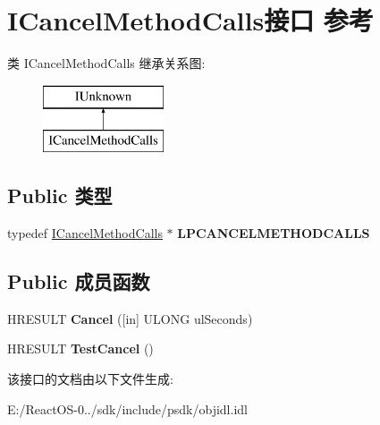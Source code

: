 \hypertarget{interface_i_cancel_method_calls}{}\section{I\+Cancel\+Method\+Calls接口 参考}
\label{interface_i_cancel_method_calls}
类 I\+Cancel\+Method\+Calls 继承关系图\+:\begin{figure}[H]
\begin{center}
\leavevmode
\includegraphics[height=2.000000cm]{interface_i_cancel_method_calls}
\end{center}
\end{figure}
\subsection*{Public 类型}
\begin{DoxyCompactItemize}
\item 
\mbox{\label{interface_i_cancel_method_calls_a931ddab7f59e6a86e57b96ee55425303}} 
typedef \hyperlink{interface_i_cancel_method_calls}{I\+Cancel\+Method\+Calls} $\ast$ {\bfseries L\+P\+C\+A\+N\+C\+E\+L\+M\+E\+T\+H\+O\+D\+C\+A\+L\+LS}
\end{DoxyCompactItemize}
\subsection*{Public 成员函数}
\begin{DoxyCompactItemize}
\item 
\mbox{\label{interface_i_cancel_method_calls_adb17d8eba4305e69436516f987698656}} 
H\+R\+E\+S\+U\+LT {\bfseries Cancel} (\mbox{[}in\mbox{]} U\+L\+O\+NG ul\+Seconds)
\item 
\mbox{\label{interface_i_cancel_method_calls_ab26443cb4135283378f0b9dbac2edfd2}} 
H\+R\+E\+S\+U\+LT {\bfseries Test\+Cancel} ()
\end{DoxyCompactItemize}


该接口的文档由以下文件生成\+:\begin{DoxyCompactItemize}
\item 
E\+:/\+React\+O\+S-\/0../sdk/include/psdk/objidl.\+idl\end{DoxyCompactItemize}

